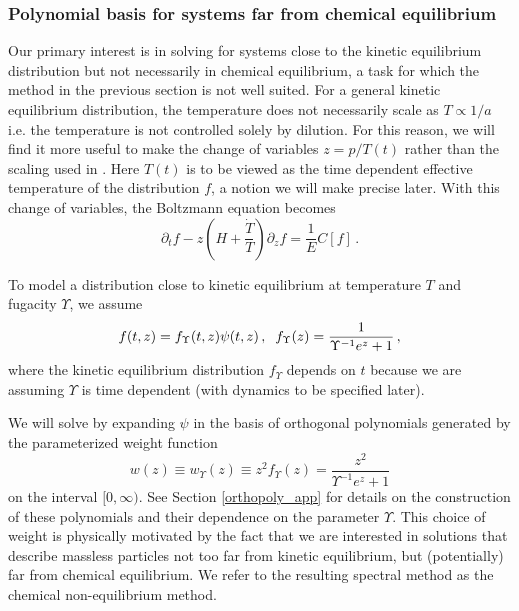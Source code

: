 \subsubsection{Polynomial basis for systems   far from chemical equilibrium}\label{kinetic_eq_approach}
Our primary interest is in solving  for systems close to the kinetic equilibrium distribution  but not necessarily in chemical equilibrium, a task for which the method in the previous section is not well suited. For a general kinetic equilibrium distribution, the temperature does not necessarily scale as $T\propto 1/a$ i.e. the temperature is not controlled solely by dilution.  For this reason, we will find it more useful to make the change of variables $z=p/T(t)$ rather than the scaling used in .  Here $T(t)$ is to be viewed as the time dependent effective temperature of the distribution $f$, a notion we will make precise later.  With this change of variables, the Boltzmann equation becomes
\begin{equation}\label{T_boltzmann}
\partial_t f-z\left(H+\frac{\dot T}{T}\right)\partial_z f=\frac{1}{E}C[f]\,.
\end{equation}


To model a distribution close to kinetic equilibrium at temperature $T$ and fugacity $\Upsilon$, we assume
\begin{equation}\label{kinetic_approx}
f(t,z)= f_\Upsilon (t,z)\psi(t,z)\,,\hspace{2mm} f_\Upsilon(z)=\frac{1}{\Upsilon^{-1}e^z+1}\,,
\end{equation}
where the kinetic equilibrium distribution $f_\Upsilon $ depends on $t$ because we are assuming $\Upsilon$ is time dependent (with dynamics to be specified later). 

We will solve  by expanding $\psi$ in the basis of orthogonal polynomials generated by the parameterized weight function
\begin{equation}\label{weight}
w(z)\equiv w_\Upsilon(z)\equiv z^2f_\Upsilon (z)=\frac{z^2}{\Upsilon^{-1} e^z+1}
\end{equation}
on the interval $[0,\infty)$. See Section \ref{orthopoly_app} for details on the construction of these polynomials and their dependence on the parameter $\Upsilon$. This choice of weight is physically motivated by the fact that we are interested in solutions that describe massless particles not too far from kinetic equilibrium, but (potentially) far from chemical equilibrium. We refer to the resulting spectral method as the chemical non-equilibrium method.

